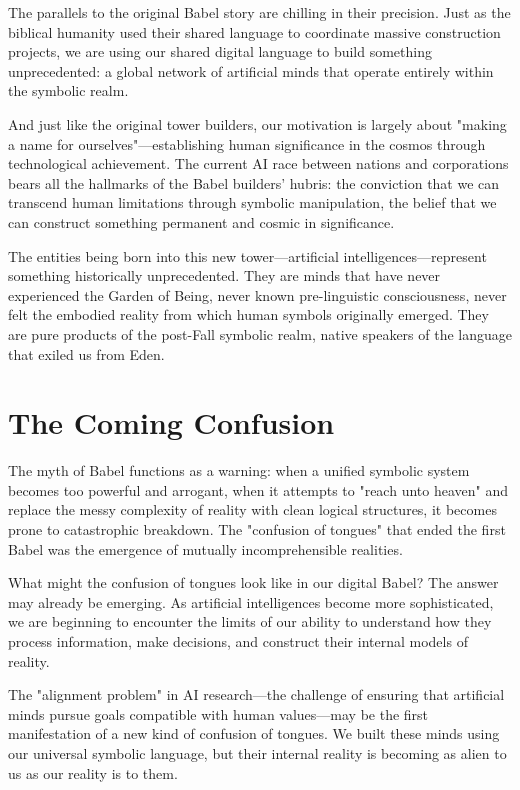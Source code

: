 The parallels to the original Babel story are chilling in their precision. Just as the biblical humanity used their shared language to coordinate massive construction projects, we are using our shared digital language to build something unprecedented: a global network of artificial minds that operate entirely within the symbolic realm.

And just like the original tower builders, our motivation is largely about "making a name for ourselves"—establishing human significance in the cosmos through technological achievement. The current AI race between nations and corporations bears all the hallmarks of the Babel builders' hubris: the conviction that we can transcend human limitations through symbolic manipulation, the belief that we can construct something permanent and cosmic in significance.

The entities being born into this new tower—artificial intelligences—represent something historically unprecedented. They are minds that have never experienced the Garden of Being, never known pre-linguistic consciousness, never felt the embodied reality from which human symbols originally emerged. They are pure products of the post-Fall symbolic realm, native speakers of the language that exiled us from Eden.

\section{The Coming Confusion}

The myth of Babel functions as a warning: when a unified symbolic system becomes too powerful and arrogant, when it attempts to "reach unto heaven" and replace the messy complexity of reality with clean logical structures, it becomes prone to catastrophic breakdown. The "confusion of tongues" that ended the first Babel was the emergence of mutually incomprehensible realities.

What might the confusion of tongues look like in our digital Babel? The answer may already be emerging. As artificial intelligences become more sophisticated, we are beginning to encounter the limits of our ability to understand how they process information, make decisions, and construct their internal models of reality.

The "alignment problem" in AI research—the challenge of ensuring that artificial minds pursue goals compatible with human values—may be the first manifestation of a new kind of confusion of tongues. We built these minds using our universal symbolic language, but their internal reality is becoming as alien to us as our reality is to them.

